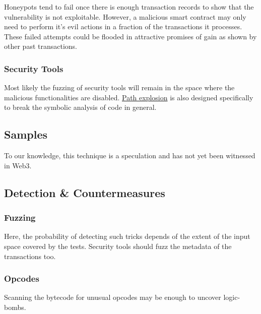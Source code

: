Honeypots tend to fail once there is enough transaction records to show that the vulnerability is not exploitable.
However, a malicious smart contract may only need to perform it's evil actions in a fraction of the transactions it processes.
These failed attempts could be flooded in attractive promises of gain as shown by other past transactions.

\subsubsection{Security Tools}

Most likely the fuzzing of security tools will remain in the space where the malicious functionalities are disabled.
\href{\urlarticlepathexplosion}{Path explosion} is also designed specifically to break the symbolic analysis of code in general.

\subsection{Samples}

To our knowledge, this technique is a speculation and has not yet been witnessed in Web3.

\subsection{Detection \& Countermeasures}

\subsubsection{Fuzzing}

Here, the probability of detecting such tricks depends of the extent of the input space covered by the tests.
Security tools should fuzz the metadata of the transactions too.

\subsubsection{Opcodes}

Scanning the bytecode for unusual opcodes may be enough to uncover logic-bombs.
